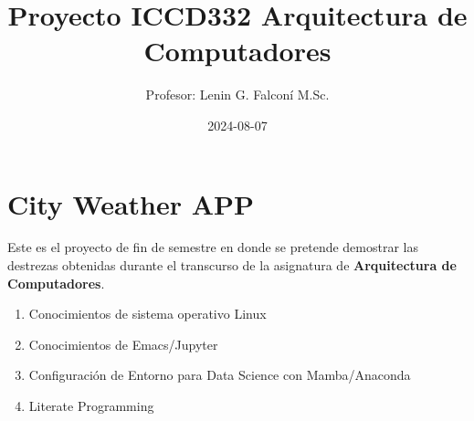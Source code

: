 \documentclass{article}
\author{Profesor: Lenin G. Falconí M.Sc.}
\date{2024-08-07}
\title{Proyecto ICCD332 Arquitectura de Computadores}
\begin{document}
\maketitle
\tableofcontents

\thispagestyle{fancy}
\section{City Weather APP}
\label{sec:orgff0555b}
Este es el proyecto de fin de semestre en donde se pretende demostrar
las destrezas obtenidas durante el transcurso de la asignatura de
\textbf{\textbf{Arquitectura de Computadores}}.

\begin{enumerate}
\item Conocimientos de sistema operativo Linux
\item Conocimientos de Emacs/Jupyter
\item Configuración de Entorno para Data Science con Mamba/Anaconda
\item Literate Programming
\end{enumerate}
\end{document}

